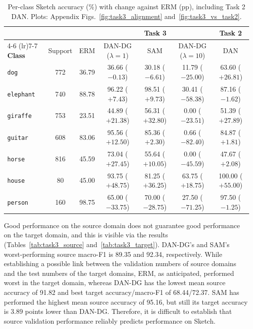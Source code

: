 \begin{table}[htbp]
  \caption{Per-class Sketch accuracy (\%) with change against ERM (pp), including Task 2 DAN. Plots: Appendix Figs.~\ref{fig:task3_alignment} and~\ref{fig:task3_vs_task2}.}
  \label{tab:task3_per_class}
  \centering
  \small
  \setlength{\tabcolsep}{2.5pt}
  \begin{tabular}{lcccccc}
    \toprule
    & & & \multicolumn{3}{c}{\textbf{Task 3}} & \textbf{Task 2} \\
    \cmidrule(lr){4-6} \cmidrule(lr){7-7}
    \textbf{Class} & Support & ERM & DAN-DG ($\lambda{=}1$) & SAM & DAN-DG ($\lambda{=}10$) & DAN \\
    \midrule
    \texttt{dog} & 772 & 36.79 & 36.66 ($-0.13$) & 30.18 ($-6.61$) & 11.79 ($-25.00$) & 63.60 ($+26.81$) \\
    \texttt{elephant} & 740 & 88.78 & 96.22 ($+7.43$) & 98.51 ($+9.73$) & 30.41 ($-58.38$) & 87.16 ($-1.62$) \\
    \texttt{giraffe} & 753 & 23.51 & 44.89 ($+21.38$) & 56.31 ($+32.80$) & 0.00 ($-23.51$) & 51.39 ($+27.89$) \\
    \texttt{guitar} & 608 & 83.06 & 95.56 ($+12.50$) & 85.36 ($+2.30$) & 0.66 ($-82.40$) & 84.87 ($+1.81$) \\
    \texttt{horse} & 816 & 45.59 & 73.04 ($+27.45$) & 55.64 ($+10.05$) & 0.00 ($-45.59$) & 47.67 ($+2.08$) \\
    \texttt{house} & 80 & 45.00 & 93.75 ($+48.75$) & 81.25 ($+36.25$) & 63.75 ($+18.75$) & 100.00 ($+55.00$) \\
    \texttt{person} & 160 & 98.75 & 65.00 ($-33.75$) & 70.00 ($-28.75$) & 27.50 ($-71.25$) & 97.50 ($-1.25$) \\
    \bottomrule
  \end{tabular}
\end{table}

Good performance on the source domain does not guarantee good performance on the target domain, and this is visible via the results (Tables~\ref{tab:task3_source} and~\ref{tab:task3_target}). DAN-DG's and SAM's worst-performing source macro-F1 is 89.35 and 92.34, respectively. While establishing a possible link between the validation numbers of source domains and the test numbers of the target domains, ERM, as anticipated, performed worst in the target domain, whereas DAN-DG has the lowest mean source accuracy of 91.82 and best target accuracy/macro-F1 of 68.44/72.37. SAM has performed the highest mean source accuracy of 95.16, but still its target accuracy is 3.89 points lower than DAN-DG. Therefore, it is difficult to establish that source validation performance reliably predicts performance on Sketch.

